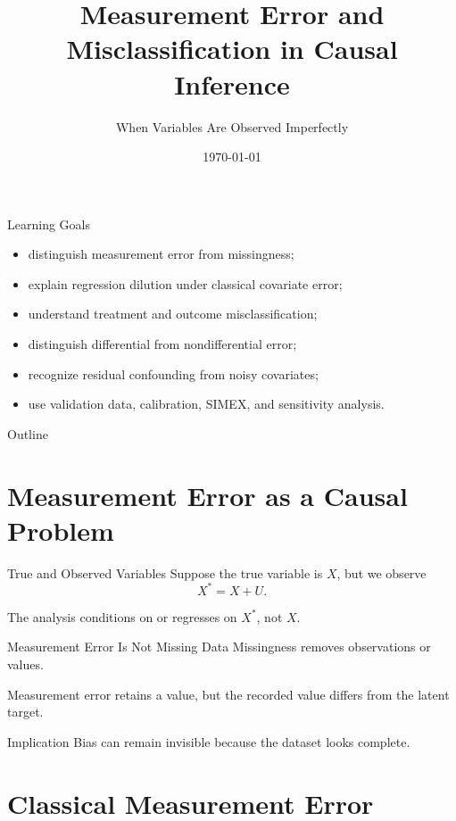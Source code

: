 \documentclass[aspectratio=169,11pt]{beamer}
\title[Measurement Error]{Measurement Error and Misclassification in Causal Inference}
\subtitle{When Variables Are Observed Imperfectly}
\date{\today}
\begin{document}
\begin{frame}
\titlepage
\end{frame}

\begin{frame}{Learning Goals}
\begin{itemize}
\item distinguish measurement error from missingness;
\item explain regression dilution under classical covariate error;
\item understand treatment and outcome misclassification;
\item distinguish differential from nondifferential error;
\item recognize residual confounding from noisy covariates;
\item use validation data, calibration, SIMEX, and sensitivity analysis.
\end{itemize}
\end{frame}

\begin{frame}{Outline}
\tableofcontents
\end{frame}

\section{Measurement Error as a Causal Problem}

\begin{frame}{True and Observed Variables}
Suppose the true variable is \(X\), but we observe
\[
X^\ast = X + U.
\]

The analysis conditions on or regresses on \(X^\ast\), not \(X\).
\end{frame}

\begin{frame}{Measurement Error Is Not Missing Data}
Missingness removes observations or values.

Measurement error retains a value, but the recorded value differs from the latent target.

\begin{alertblock}{Implication}
Bias can remain invisible because the dataset looks complete.
\end{alertblock}
\end{frame}

\section{Classical Measurement Error}
\end{document}
